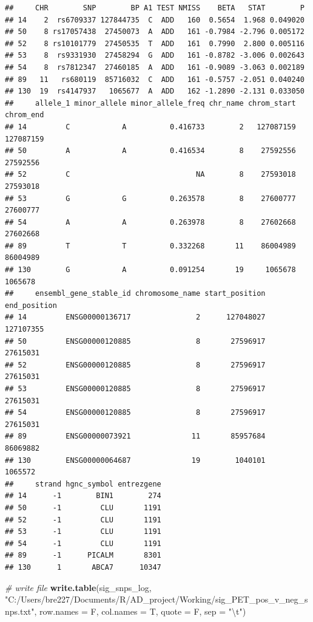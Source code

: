 \documentclass[]{article}
\newenvironment{Shaded}{\begin{snugshade}}{\end{snugshade}}
\newcommand{\KeywordTok}[1]{\textcolor[rgb]{0.13,0.29,0.53}{\textbf{#1}}}
\newcommand{\DataTypeTok}[1]{\textcolor[rgb]{0.13,0.29,0.53}{#1}}
\newcommand{\CharTok}[1]{\textcolor[rgb]{0.31,0.60,0.02}{#1}}
\newcommand{\StringTok}[1]{\textcolor[rgb]{0.31,0.60,0.02}{#1}}
\newcommand{\CommentTok}[1]{\textcolor[rgb]{0.56,0.35,0.01}{\textit{#1}}}
\newcommand{\NormalTok}[1]{#1}
\begin{document}
\begin{verbatim}
##     CHR        SNP        BP A1 TEST NMISS    BETA   STAT        P
## 14    2  rs6709337 127844735  C  ADD   160  0.5654  1.968 0.049020
## 50    8 rs17057438  27450073  A  ADD   161 -0.7984 -2.796 0.005172
## 52    8 rs10101779  27450535  T  ADD   161  0.7990  2.800 0.005116
## 53    8  rs9331930  27458294  G  ADD   161 -0.8782 -3.006 0.002643
## 54    8  rs7812347  27460185  A  ADD   161 -0.9089 -3.063 0.002189
## 89   11   rs680119  85716032  C  ADD   161 -0.5757 -2.051 0.040240
## 130  19  rs4147937   1065677  A  ADD   162 -1.2890 -2.131 0.033050
##     allele_1 minor_allele minor_allele_freq chr_name chrom_start chrom_end
## 14         C            A          0.416733        2   127087159 127087159
## 50         A            A          0.416534        8    27592556  27592556
## 52         C                             NA        8    27593018  27593018
## 53         G            G          0.263578        8    27600777  27600777
## 54         A            A          0.263978        8    27602668  27602668
## 89         T            T          0.332268       11    86004989  86004989
## 130        G            A          0.091254       19     1065678   1065678
##     ensembl_gene_stable_id chromosome_name start_position end_position
## 14         ENSG00000136717               2      127048027    127107355
## 50         ENSG00000120885               8       27596917     27615031
## 52         ENSG00000120885               8       27596917     27615031
## 53         ENSG00000120885               8       27596917     27615031
## 54         ENSG00000120885               8       27596917     27615031
## 89         ENSG00000073921              11       85957684     86069882
## 130        ENSG00000064687              19        1040101      1065572
##     strand hgnc_symbol entrezgene
## 14      -1        BIN1        274
## 50      -1         CLU       1191
## 52      -1         CLU       1191
## 53      -1         CLU       1191
## 54      -1         CLU       1191
## 89      -1      PICALM       8301
## 130      1       ABCA7      10347
\end{verbatim}

\begin{Shaded}
\begin{Highlighting}[]
\CommentTok{# write file}
\KeywordTok{write.table}\NormalTok{(sig_snps_log, }\StringTok{"C:/Users/bre227/Documents/R/AD_project/Working/sig_PET_pos_v_neg_snps.txt"}\NormalTok{, }\DataTypeTok{row.names =}\NormalTok{ F, }\DataTypeTok{col.names =}\NormalTok{ T, }\DataTypeTok{quote =}\NormalTok{ F, }\DataTypeTok{sep =} \StringTok{"}\CharTok{\textbackslash{}t}\StringTok{"}\NormalTok{)}
\end{Highlighting}
\end{Shaded}
\end{document}
